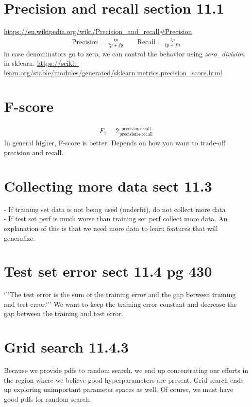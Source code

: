 \documentclass{article}
\newcommand{\ber}{\begin{eqnarray}}
\newcommand{\eer}{\end{eqnarray}}
\begin{document}
\section{Precision and recall section 11.1}
\url{https://en.wikipedia.org/wiki/Precision_and_recall#Precision}
\ber
\text{Precision} = \frac{tp}{tp+fp} \qquad \text{Recall} = \frac{tp}{tp+fn}
\eer
in case denominators go to zero, we can control the behavior using \textit{zero\_division} in sklearn. \url{https://scikit-learn.org/stable/modules/generated/sklearn.metrics.precision_score.html}
%
%
\section{F-score}
\ber
F_1 = 2\frac{\text{precision}\text{recall}}{\text{precision}+\text{recall}}
\eer
In general higher, F-score is better. Depends on how you want to trade-off precision and recall.
%
%
%
\section{Collecting more data sect 11.3}
- If training set data is not being used (underfit), do not collect more data\\
- If test set perf is much worse than training set perf collect more data. An explanation of this is that we need more data to learn features that will generalize.

\section{Test set error sect 11.4 pg 430}
`''The test error is the sum of the training error and the gap between training and test error.`'' We want to keep the training error constant and decrease the gap between the training and test error.
%
%
%
\section{Grid search 11.4.3}
Because we provide pdfs to random search, we end up concentrating our efforts in the region where we believe good hyperparameters are present. Grid search ends up exploring unimportant parameter spaces as well. Of course, we must have good pdfs for random search.
%
%
%
\section{}
%
%
%
\end{document}
